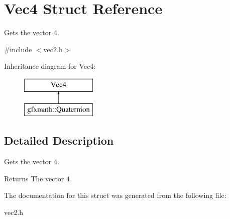 \hypertarget{struct_vec4}{}\section{Vec4 Struct Reference}
\label{struct_vec4}


Gets the vector 4.  




{\ttfamily \#include $<$vec2.\+h$>$}

Inheritance diagram for Vec4\+:\begin{figure}[H]
\begin{center}
\leavevmode
\includegraphics[height=2.000000cm]{struct_vec4}
\end{center}
\end{figure}


\subsection{Detailed Description}
Gets the vector 4. 

\begin{DoxyReturn}{Returns}
The vector 4. 
\end{DoxyReturn}


The documentation for this struct was generated from the following file\+:\begin{DoxyCompactItemize}
\item 
vec2.\+h\end{DoxyCompactItemize}
